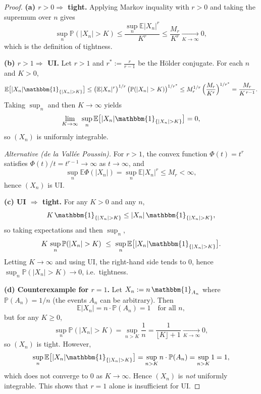 \documentclass[12pt]{article}
\renewcommand{\(}{\left(}%
\renewcommand{\)}{\right)}%
\renewcommand{\[}{\left[}%
\renewcommand{\]}{\right]}%
\newtheorem{proof}{Proof.}}
\begin{document}
\begin{proof}
\textbf{(a) $r>0\Rightarrow$ tight.}
Applying Markov inquality with $r>0$ and taking the supremum over $n$ gives
\begin{equation*}
  \sup_n \mathbb P(|X_n|>K)
  \le \frac{\sup_n \mathbb E|X_n|^r}{K^r}
  \le \frac{M_r}{K^r}\xrightarrow[K\to\infty]{}0,
\end{equation*}
which is the definition of tightness.

\medskip
\textbf{(b) $r>1\Rightarrow$ UI.}
Let $r>1$ and $r^\ast:=\frac{r}{r-1}$ be the Hölder conjugate. For each $n$ and $K>0$,
\begin{equation*}
  \mathbb E\big[|X_n|\mathbbm{1}_{\{|X_n|>K\}}\big]
  \le \big(\mathbb E|X_n|^r\big)^{1/r}\,
      \big(\mathbb P(|X_n|>K)\big)^{1/r^\ast}
  \le M_r^{1/r}\,\Big(\frac{M_r}{K^r}\Big)^{1/r^\ast}
  = \frac{M_r}{K^{\,r-1}}.
\end{equation*}
Taking $\sup_n$ and then $K\to\infty$ yields
\begin{equation*}
  \lim_{K\to\infty}\ \sup_n \mathbb E\big[|X_n|\mathbbm{1}_{\{|X_n|>K\}}\big]=0,
\end{equation*}
so $(X_n)$ is uniformly integrable.

\emph{Alternative (de la Vallée Poussin).} For $r>1$, the convex function $\Phi(t)=t^r$ satisfies $\Phi(t)/t=t^{r-1}\to\infty$ as $t\to\infty$, and
\begin{equation*}
  \sup_n \mathbb E\Phi(|X_n|)=\sup_n \mathbb E|X_n|^r\le M_r<\infty,
\end{equation*}
hence $(X_n)$ is UI.

\medskip
\textbf{(c) UI $\Rightarrow$ tight.}
For any $K>0$ and any $n$,
\begin{equation*}
  K\,\mathbbm{1}_{\{|X_n|>K\}}\le |X_n|\,\mathbbm{1}_{\{|X_n|>K\}},
\end{equation*}
so taking expectations and then $\sup_n$,
\begin{equation*}
  K\,\sup_n \mathbb P(|X_n|>K)\ \le\ \sup_n \mathbb E\big[|X_n|\mathbbm{1}_{\{|X_n|>K\}}\big].
\end{equation*}
Letting $K\to\infty$ and using UI, the right-hand side tends to $0$, hence $\sup_n \mathbb P(|X_n|>K)\to 0$, i.e.\ tightness.

\medskip
\textbf{(d) Counterexample for $r=1$.}
Let $X_n:=n\,\mathbbm{1}_{A_n}$ where $\mathbb P(A_n)=1/n$ (the events $A_n$ can be arbitrary). Then
\begin{equation*}
  \mathbb E|X_n|=n\cdot \mathbb P(A_n)=1\quad\text{for all }n,
\end{equation*}
but for any $K\ge0$,
\begin{equation*}
  \sup_n \mathbb P(|X_n|>K)=\sup_{n>K}\frac{1}{n}=\frac{1}{\lfloor K\rfloor+1}\xrightarrow[K\to\infty]{}0,
\end{equation*}
so $(X_n)$ is tight. However,
\begin{equation*}
  \sup_n \mathbb E\big[|X_n|\mathbbm{1}_{\{|X_n|>K\}}\big]
  =\sup_{n>K} n\cdot \mathbb P(A_n)=\sup_{n>K} 1=1,
\end{equation*}
which does not converge to $0$ as $K\to\infty$. Hence $(X_n)$ is \emph{not} uniformly integrable. This shows that $r=1$ alone is insufficient for UI.
\end{proof}
\end{document}
